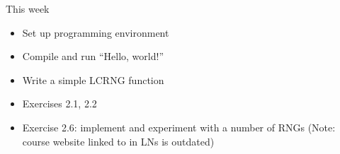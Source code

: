 \documentclass[10pt]{beamer}
\begin{document}
\begin{frame}[label={sec:org455ab53}]{This week}
\begin{itemize}
\item Set up programming environment
\item Compile and run ``Hello, world!''
\item Write a simple LCRNG function
\item Exercises \alert{2.1, 2.2}
\item Exercise \alert{2.6}: implement and experiment with a number of RNGs (Note: course
website linked to in LNs is outdated)
\end{itemize}
\end{frame}
\end{document}
